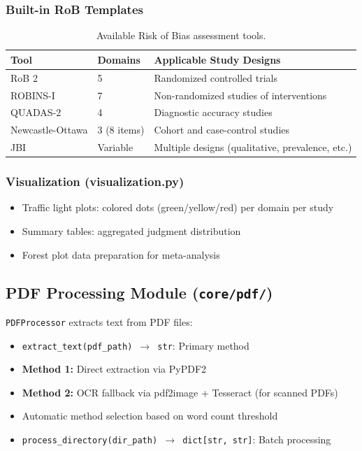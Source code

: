 \documentclass[11pt,a4paper]{article}
\begin{document}
\subsubsection{Built-in RoB Templates}

\begin{table}[H]
\centering\small
\begin{tabular}{lp{2cm}p{6cm}}
\toprule
\textbf{Tool} & \textbf{Domains} & \textbf{Applicable Study Designs} \\
\midrule
RoB 2 & 5 & Randomized controlled trials \\
ROBINS-I & 7 & Non-randomized studies of interventions \\
QUADAS-2 & 4 & Diagnostic accuracy studies \\
Newcastle-Ottawa & 3 (8 items) & Cohort and case-control studies \\
JBI & Variable & Multiple designs (qualitative, prevalence, etc.) \\
\bottomrule
\end{tabular}
\caption{Available Risk of Bias assessment tools.}
\end{table}

\subsubsection{Visualization (visualization.py)}
\begin{itemize}[nosep]
  \item Traffic light plots: colored dots (green/yellow/red) per domain per study
  \item Summary tables: aggregated judgment distribution
  \item Forest plot data preparation for meta-analysis
\end{itemize}

\subsection{PDF Processing Module (\texttt{core/pdf/})}

\texttt{PDFProcessor} extracts text from PDF files:
\begin{itemize}[nosep]
  \item \texttt{extract\_text(pdf\_path) $\to$ str}: Primary method
  \item \textbf{Method 1:} Direct extraction via PyPDF2
  \item \textbf{Method 2:} OCR fallback via pdf2image + Tesseract (for scanned PDFs)
  \item Automatic method selection based on word count threshold
  \item \texttt{process\_directory(dir\_path) $\to$ dict[str, str]}: Batch processing
\end{itemize}
\end{document}
